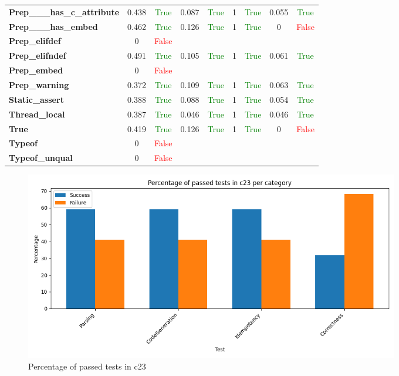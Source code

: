 \documentclass{article}
\begin{document}
\begin{xltabular}{\textwidth}{lcccccccc}
\textbf{{\fontsize{10}{12}\selectfont Prep\_\_\_has\_c\_attribute}}& 0.438&\textcolor{green}{True}& 0.087&\textcolor{green}{True}& 1&\textcolor{green}{True}& 0.055&\textcolor{green}{True} \\[0.5ex]
\textbf{{\fontsize{10}{12}\selectfont Prep\_\_\_has\_embed}}& 0.462&\textcolor{green}{True}& 0.126&\textcolor{green}{True}& 1&\textcolor{green}{True}& 0&\textcolor{red}{False} \\[0.5ex]
\textbf{{\fontsize{10}{12}\selectfont Prep\_elifdef}}& 0&\textcolor{red}{False} \\[0.5ex]
\textbf{{\fontsize{10}{12}\selectfont Prep\_elifndef}}& 0.491&\textcolor{green}{True}& 0.105&\textcolor{green}{True}& 1&\textcolor{green}{True}& 0.061&\textcolor{green}{True} \\[0.5ex]
\textbf{{\fontsize{10}{12}\selectfont Prep\_embed}}& 0&\textcolor{red}{False} \\[0.5ex]
\textbf{{\fontsize{10}{12}\selectfont Prep\_warning}}& 0.372&\textcolor{green}{True}& 0.109&\textcolor{green}{True}& 1&\textcolor{green}{True}& 0.063&\textcolor{green}{True} \\[0.5ex]
\textbf{{\fontsize{10}{12}\selectfont Static\_assert}}& 0.388&\textcolor{green}{True}& 0.088&\textcolor{green}{True}& 1&\textcolor{green}{True}& 0.054&\textcolor{green}{True} \\[0.5ex]
\textbf{{\fontsize{10}{12}\selectfont Thread\_local}}& 0.387&\textcolor{green}{True}& 0.046&\textcolor{green}{True}& 1&\textcolor{green}{True}& 0.046&\textcolor{green}{True} \\[0.5ex]
\textbf{{\fontsize{10}{12}\selectfont True}}& 0.419&\textcolor{green}{True}& 0.126&\textcolor{green}{True}& 1&\textcolor{green}{True}& 0&\textcolor{red}{False} \\[0.5ex]
\textbf{{\fontsize{10}{12}\selectfont Typeof}}& 0&\textcolor{red}{False} \\[0.5ex]
\textbf{{\fontsize{10}{12}\selectfont Typeof\_unqual}}& 0&\textcolor{red}{False} \\[0.5ex]
\bottomrule
\end{xltabular}
\newpage
\begin{figure}[h!]
\centering
\includegraphics[width=0.8\textwidth]{../reports/clava/images/c23_percentage.png}
\caption{Percentage of passed tests in c23}
\label{fig:c23_percentage}
\end{figure}
\newpage
\end{document}
